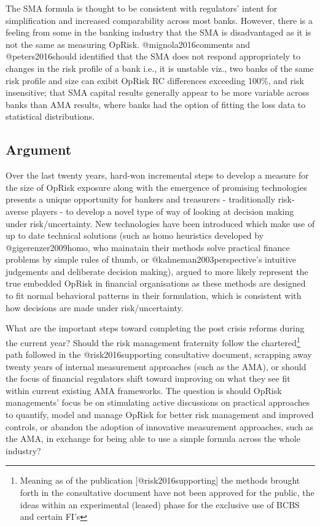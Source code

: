 \documentclass[
]{article}
\begin{document}
The SMA formula is thought to be consistent with regulators' intent for
simplification and increased comparability across most banks. However,
there is a feeling from some in the banking industry that the SMA is
disadvantaged as it is not the same as measuring OpRisk.
@mignola2016comments and @peters2016should identified that the SMA does
not respond appropriately to changes in the risk profile of a bank i.e.,
it is unstable viz., two banks of the same risk profile and size can
exibit OpRisk RC differences exceeding 100\%, and risk insensitive; that
SMA capital results generally appear to be more variable across banks
than AMA results, where banks had the option of fitting the loss data to
statistical distributions.

\subsection{Argument}
\label{ssec:Argument}

Over the last twenty years, hard-won incremental steps to develop a
measure for the size of OpRisk exposure along with the emergence of
promising technologies presents a unique opportunity for bankers and
treasurers - traditionally risk-averse players - to develop a novel type
of way of looking at decision making under risk/uncertainty. New
technologies have been introduced which make use of up to date technical
solutions (such as homo heuristics developed by @gigerenzer2009homo, who
mainatain their methods solve practical finance problems by simple rules
of thumb, or @kahneman2003perspective's intuitive judgements and
deliberate decision making), argued to more likely represent the true
embedded OpRisk in financial organisations as these methods are designed
to fit normal behavioral patterns in their formulation, which is
consistent with how decisions are made under risk/uncertainty.\medskip 

What are the important steps toward completing the post crisis reforms
during the current year? Should the risk management fraternity follow
the
chartered\footnote{Meaning as of the publication [@risk2016supporting] the methods brought forth in the consultative document have not been approved for the public, the ideas within an experimental (leased) phase for the exclusive use of BCBS and certain FI's}
path followed in the @risk2016supporting consultative document,
scrapping away twenty years of internal measurement approaches (such as
the AMA), or should the focus of financial regulators shift toward
improving on what they see fit within current existing AMA frameworks.
The question is should OpRisk managements' focus be on stimulating
active discussions on practical approaches to quantify, model and manage
OpRisk for better risk management and improved controls, or abandon the
adoption of innovative measurement approaches, such as the AMA, in
exchange for being able to use a simple formula across the whole
industry?
\end{document}
